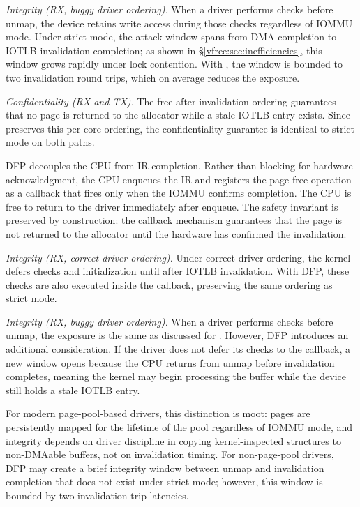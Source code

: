 \emph{Integrity (RX, buggy driver ordering).}
When a driver performs checks before unmap, the device retains write access during those checks regardless of IOMMU mode.
Under strict mode, the attack window spans from DMA completion to IOTLB invalidation completion; as shown in \S\ref{vfree:sec:inefficiencies}, this window grows rapidly under lock contention.
With \optOne, the window is bounded to two invalidation round trips, which on average reduces the exposure.

\emph{Confidentiality (RX and TX).}
The free-after-invalidation ordering guarantees that no page is returned to the allocator while a stale IOTLB entry exists.
Since \optOne preserves this per-core ordering, the confidentiality guarantee is identical to strict mode on both paths.
\fi

DFP decouples the CPU from IR completion. Rather than blocking for hardware acknowledgment, 
    the CPU enqueues the IR and registers the page-free operation 
    as a callback that fires only when the IOMMU confirms completion.
The CPU is free to return to the driver immediately after enqueue.
The safety invariant is preserved by construction: 
    the callback mechanism guarantees that the page is not returned to the allocator 
    until the hardware has confirmed the invalidation.


\emph{Integrity (RX, correct driver ordering).}
Under correct driver ordering, the kernel defers checks and initialization until after IOTLB invalidation.
With DFP, these checks are also executed inside the callback, preserving the same ordering as strict mode.

\emph{Integrity (RX, buggy driver ordering).}
When a driver performs checks before unmap, the exposure is the same as discussed for \optOne.
However, DFP introduces an additional consideration.
If the driver does not defer its checks to the callback, a new window opens because the CPU returns from unmap before invalidation completes, meaning the kernel may begin processing the buffer while the device still holds a stale IOTLB entry.

For modern page-pool-based drivers, this distinction is moot: pages are persistently mapped for the lifetime of the pool regardless of IOMMU mode, and integrity depends on driver discipline in copying kernel-inspected structures to non-DMAable buffers, not on invalidation timing.
For non-page-pool drivers, DFP may create a brief integrity window between unmap and invalidation completion that does not exist under strict mode; however, this window is bounded by two invalidation trip latencies.

